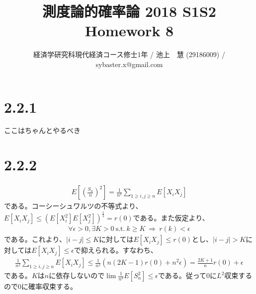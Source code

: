 \documentclass{article}
\begin{document}
\title{測度論的確率論 2018 S1S2 \\ 
Homework 8}
\author{経済学研究科現代経済コース修士1年 / 池上　慧 (29186009) / sybaster.x@gmail.com}
\maketitle

\section{2.2.1}
ここはちゃんとやるべき

\section{2.2.2}
\begin{align*}
	E\left[ \left(\frac{S_n}{n}\right)^2 \right] = \frac{1}{n^2} \sum_{1\geq i,j\geq n} E\left[ X_i X_j \right]
\end{align*}
である。コーシーシュワルツの不等式より、$E\left[ X_i X_j \right] \leq \left( E\left[ X_i^2 \right] E\left[ X_j^2 \right] \right)^{\frac{1}{2}} = r(0)$である。また仮定より、
\begin{align*}
	\forall \epsilon > 0, \exists K > 0\ \text{s.t.}\ k \geq K\ \Rightarrow\ r(k) < \epsilon
\end{align*}
である。これより、$|i-j| \leq K$に対しては$E[X_i X_j] \leq r(0)$とし、$|i-j| > K$に対しては$E[X_i X_j] \leq \epsilon$で抑えられる。すなわち、
\begin{align*}
	\frac{1}{n^2} \sum_{1\geq i,j\geq n} E\left[ X_i X_j \right] \leq \frac{1}{n^2} \left( n(2K-1)r(0) + n^2\epsilon \right) = \frac{2K+1}{n}r(0) + \epsilon
\end{align*}
である。$K$は$n$に依存しないので$\lim \frac{1}{n^2} E[S_n^2] \leq \epsilon$である。従って$0$に$L^2$収束するので$0$に確率収束する。
\end{document}
